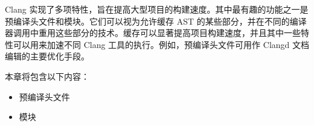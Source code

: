 Clang 实现了多项特性，旨在提高大型项目的构建速度。其中最有趣的功能之一是预编译头文件和模块。它们可以视为允许缓存 AST 的某些部分，并在不同的编译器调用中重用这些部分的技术。缓存可以显著提高项目构建速度，并且其中一些特性可以用来加速不同 Clang 工具的执行。例如，预编译头文件可用作 Clangd 文档编辑的主要优化手段。

本章将包含以下内容：

\begin{itemize}
\item
预编译头文件

\item
模块
\end{itemize}

